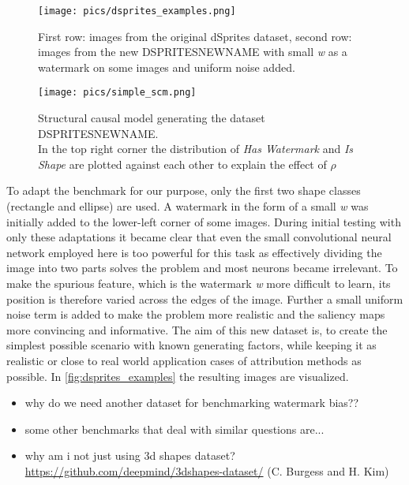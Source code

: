 \begin{figure}[H]
    \centering
    \texttt{[image: pics/dsprites\_examples.png]}
    \caption{First row: images from the original dSprites dataset, second row: images from the new DSPRITESNEWNAME with small \textit{w} as a watermark on some images and uniform noise added.}
    \label{fig:dsprites_examples}
\end{figure}

\begin{figure}[H]
    \centering
    \texttt{[image: pics/simple\_scm.png]}
    \caption{Structural causal model generating the dataset DSPRITESNEWNAME.\\
        In the top right corner the distribution of \textit{Has Watermark} and \textit{Is Shape} are plotted against each other to explain the effect of $\rho$}
    \label{fig:simple_scm}
\end{figure}

To adapt the benchmark for our purpose, only the first two shape classes (rectangle and ellipse) are used. A watermark in the form of a small \textit{w} was initially added to the lower-left corner of some images. During initial testing with only these adaptations it became clear that even the small convolutional neural network employed here is too powerful for this task as effectively dividing the image into two parts solves the problem and most neurons became irrelevant.
To make the spurious feature, which is the watermark \textit{w} more difficult to learn, its position is therefore varied across the edges of the image. Further a small uniform noise term is added to make the problem more realistic and the saliency maps more convincing and informative.
The aim of this new dataset is, to create the simplest possible scenario with known generating factors, while keeping it as realistic or close to real world application cases of attribution methods as possible. In \autoref{fig:dsprites_examples} the resulting images are visualized.

\begin{itemize}
    \item why do we need another dataset for benchmarking watermark bias??
    \item some other benchmarks that deal with similar questions are...
    \item why am i not just using 3d shapes dataset? \url{https://github.com/deepmind/3dshapes-dataset/} (C. Burgess and H. Kim)
\end{itemize}

